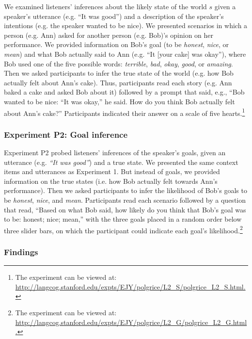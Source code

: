 We examined listeners' inferences about the likely state of the world $s$ given a speaker's utterance (e.g. ``It was good'') and a description of the speaker's intentions (e.g. the speaker wanted to be nice). We presented scenarios in which a person (e.g. Ann) asked for another person (e.g. Bob)'s opinion on her performance. We provided information on Bob's goal (to be \emph{honest}, \emph{nice}, or \emph{mean}) and what Bob actually said to Ann (e.g. ``It [your cake] was okay''), where Bob used one of the five possible words: \emph{terrible}, \emph{bad}, \emph{okay}, \emph{good}, or \emph{amazing}. Then we asked participants to infer the true state of the world (e.g. how Bob actually felt about Ann's cake). Thus, participants read each story (e.g. Ann baked a cake and asked Bob about it) followed by a prompt that said,
e.g., ``Bob wanted to be nice: ``It was okay,'' he said. How do you think Bob actually felt about Ann's cake?''
Participants indicated their answer on a scale of five hearts.\footnote{The experiment can be viewed at: \url{http://langcog.stanford.edu/expts/EJY/polgrice/L2_S/polgrice_L2_S.html.}} 

\subsubsection{Experiment P2: Goal inference}

Experiment P2 probed listeners' inferences of the speaker's goals, given an utterance (e.g. \emph{``It was good''}) and a true state. We presented the same context items and utterances as Experiment 1. But instead of goals, we provided information on the true states (i.e. how Bob actually felt towards Ann's performance).
Then we asked participants to infer the likelihood of Bob's goals to be \emph{honest}, \emph{nice}, and \emph{mean}.
Participants read each scenario followed by a question that read, ``Based on what Bob said, how likely do you think that Bob's goal was to be: honest; nice; mean,'' with the three goals placed in a random order below three slider bars, on which the participant could indicate each goal's likelihood.\footnote{The experiment can be viewed at: \url{http://langcog.stanford.edu/expts/EJY/polgrice/L2_G/polgrice_L2_G.html.}}

\subsubsection{Findings}

